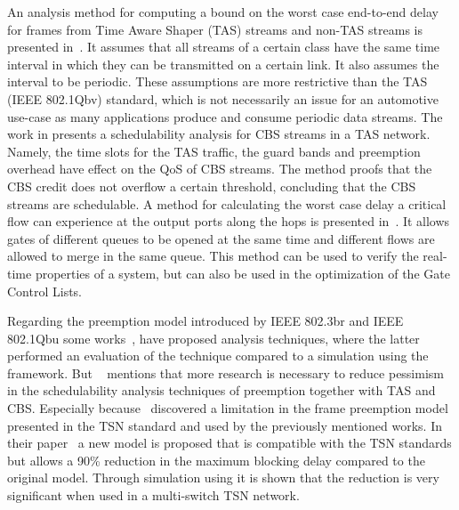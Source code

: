 An analysis method for computing a bound on the worst case end-to-end delay for frames from Time Aware Shaper (TAS) streams and non-TAS streams is presented in~\cite{thiele2015formal}. It assumes that all streams of a certain class have the same time interval in which they can be transmitted on a certain link. It also assumes the interval to be periodic. These assumptions are more restrictive than the TAS (IEEE 802.1Qbv) standard, which is not necessarily an issue for an automotive use-case as many applications produce and consume periodic data streams. The work in \cite{zhao2018timing} presents a schedulability analysis for CBS streams in a TAS network. Namely, the time slots for the TAS traffic, the guard bands and preemption overhead have effect on the QoS of CBS streams. The method proofs that the CBS credit does not overflow a certain threshold, concluding that the CBS streams are schedulable. A method for calculating the worst case delay a critical flow can experience at the output ports along the hops is presented in~\cite{zhao2018worst}. It allows gates of different queues to be opened at the same time and different flows are allowed to merge in the same queue. This method can be used to verify the real-time properties of a system, but can also be used in the optimization of the Gate Control Lists.

Regarding the preemption model introduced by IEEE 802.3br and IEEE 802.1Qbu some works~\cite{thiele2016formal},\cite{bello2020schedulability} have proposed analysis techniques, where the latter performed an evaluation of the technique compared to a simulation using the \omnet framework. But ~\cite{ashjaei2021time} mentions that more research is necessary to reduce pessimism in the schedulability analysis techniques of preemption together with TAS and CBS. Especially because~\cite{ashjaei2021novel} discovered a limitation in the frame preemption model presented in the TSN standard and used by the previously mentioned works. In their paper~\cite{ashjaei2021novel} a new model is proposed that is compatible with the TSN standards but allows a 90\% reduction in the maximum blocking delay compared to the original model. Through simulation using \omnet it is shown that the reduction is very significant when used in a multi-switch TSN network.


